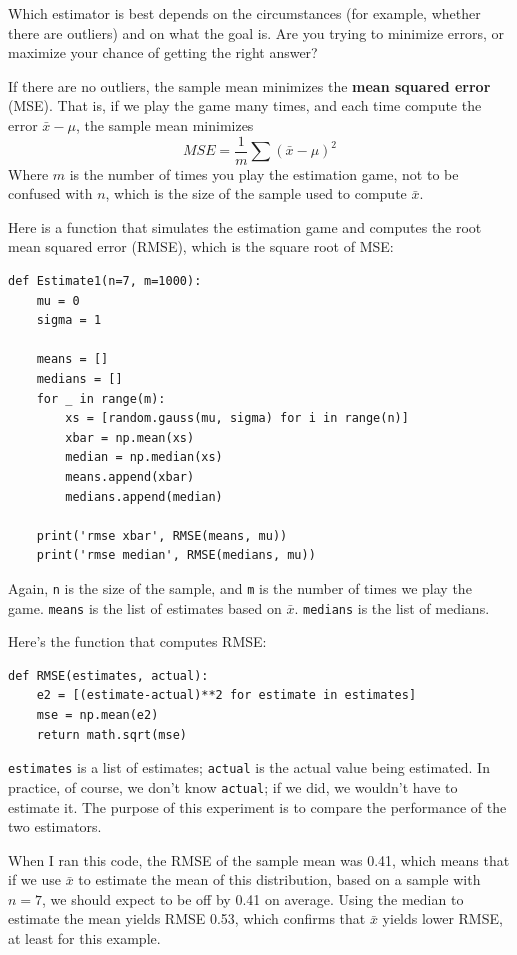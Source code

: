 \documentclass[12pt]{book}
\newcommand{\xbar}{\bar{x}}
\theoremstyle{exercise}
\begin{document}
Which estimator is best depends on the circumstances (for example,
whether there are outliers) and on what the goal is.  Are you
trying to minimize errors, or maximize your chance of getting the
right answer?%
%
%

If there are no outliers, the sample mean minimizes the {\bf mean squared
error} (MSE).  That is, if we play the game many times, and each time
compute the error $\xbar - \mu$, the sample mean minimizes
%
\[ MSE = \frac{1}{m} \sum (\xbar - \mu)^2 \]
%
Where $m$ is the number of times you play the estimation game, not
to be confused with $n$, which is the size of the sample used to
compute $\xbar$.

Here is a function that simulates the estimation game and computes
the root mean squared error (RMSE), which is the square root of
MSE:%
%
%

\begin{verbatim}
def Estimate1(n=7, m=1000):
    mu = 0
    sigma = 1

    means = []
    medians = []
    for _ in range(m):
        xs = [random.gauss(mu, sigma) for i in range(n)]
        xbar = np.mean(xs)
        median = np.median(xs)
        means.append(xbar)
        medians.append(median)

    print('rmse xbar', RMSE(means, mu))
    print('rmse median', RMSE(medians, mu))
\end{verbatim}

Again, {\tt n} is the size of the sample, and {\tt m} is the
number of times we play the game.  {\tt means} is the list of
estimates based on $\xbar$.  {\tt medians} is the list of medians.%

Here's the function that computes RMSE:

\begin{verbatim}
def RMSE(estimates, actual):
    e2 = [(estimate-actual)**2 for estimate in estimates]
    mse = np.mean(e2)
    return math.sqrt(mse)
\end{verbatim}

{\tt estimates} is a list of estimates; {\tt actual} is the
actual value being estimated.  In practice, of course, we don't
know {\tt actual}; if we did, we wouldn't have to estimate it.
The purpose of this experiment is to compare the performance of
the two estimators.%

When I ran this code, the RMSE of the sample mean was 0.41, which
means that if we use $\xbar$ to estimate the mean of this
distribution, based on a sample with $n=7$, we should expect to be off
by 0.41 on average.  Using the median to estimate the mean yields
RMSE 0.53, which confirms that $\xbar$ yields lower RMSE, at least
for this example.
\end{document}
